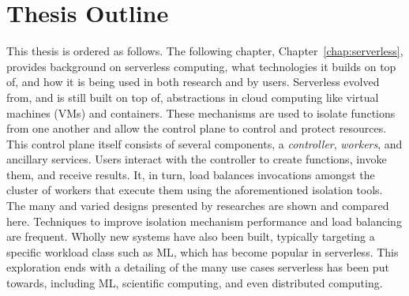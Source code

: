 



\section{Thesis Outline}

This thesis is ordered as follows.
The following chapter, Chapter~\ref{chap:serverless}, provides background on serverless computing, what technologies it builds on top of, and how it is being used in both research and by users.
Serverless evolved from, and is still built on top of, abstractions in cloud computing like virtual machines (VMs) and containers.
These mechanisms are used to isolate functions from one another and allow the control plane to control and protect resources.
This control plane itself consists of several components, a \emph{controller}, \emph{workers}, and ancillary services.
Users interact with the controller to create functions, invoke them, and receive results.
It, in turn, load balances invocations amongst the cluster of workers that execute them using the aforementioned isolation tools.
The many and varied designs presented by researches are shown and compared here.
Techniques to improve isolation mechanism performance and load balancing are frequent.
Wholly new systems have also been built, typically targeting a specific workload class such as ML, which has become popular in serverless.
This exploration ends with a detailing of the many use cases serverless has been put towards, including ML, scientific computing, and even distributed computing.

